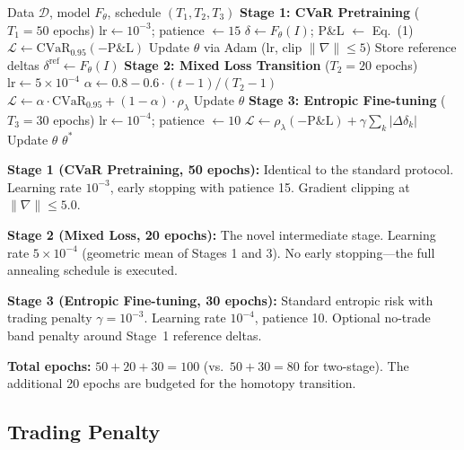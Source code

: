 \documentclass[11pt]{article}
\newcommand{\cvar}{\mathrm{CVaR}}
\begin{document}
\begin{algorithm}[t]
\caption{Three-Stage Curriculum Hedger (3SCH)}
\label{alg:3sch}
\begin{algorithmic}[1]
\REQUIRE Data $\mathcal{D}$, model $F_\theta$, schedule $(T_1, T_2, T_3)$
\STATE \textbf{Stage 1: CVaR Pretraining} ($T_1 = 50$ epochs)
\STATE $\text{lr} \gets 10^{-3}$; patience $\gets 15$
        \STATE $\delta \gets F_\theta(I)$; P\&L $\gets$ Eq.~(1)
        \STATE $\mathcal{L} \gets \cvar_{0.95}(-\text{P\&L})$
        \STATE Update $\theta$ via Adam (lr, clip $\|\nabla\| \leq 5$)
    \ENDFOR
\ENDFOR
\STATE Store reference deltas $\delta^{\text{ref}} \gets F_\theta(I)$
\STATE
\STATE \textbf{Stage 2: Mixed Loss Transition} ($T_2 = 20$ epochs)
\STATE $\text{lr} \gets 5 \times 10^{-4}$
    \STATE $\alpha \gets 0.8 - 0.6 \cdot (t-1) / (T_2 - 1)$
        \STATE $\mathcal{L} \gets \alpha \cdot \cvar_{0.95} + (1-\alpha) \cdot \rho_\lambda$
        \STATE Update $\theta$
    \ENDFOR
\ENDFOR
\STATE
\STATE \textbf{Stage 3: Entropic Fine-tuning} ($T_3 = 30$ epochs)
\STATE $\text{lr} \gets 10^{-4}$; patience $\gets 10$
        \STATE $\mathcal{L} \gets \rho_\lambda(-\text{P\&L}) + \gamma\sum_k|\Delta\delta_k|$
        \STATE Update $\theta$
    \ENDFOR
\ENDFOR
\RETURN $\theta^*$
\end{algorithmic}
\end{algorithm}

\textbf{Stage 1 (CVaR Pretraining, 50 epochs):} Identical to the standard protocol. Learning rate $10^{-3}$, early stopping with patience 15. Gradient clipping at $\|\nabla\| \leq 5.0$.

\textbf{Stage 2 (Mixed Loss, 20 epochs):} The novel intermediate stage. Learning rate $5 \times 10^{-4}$ (geometric mean of Stages 1 and 3). No early stopping---the full annealing schedule is executed.

\textbf{Stage 3 (Entropic Fine-tuning, 30 epochs):} Standard entropic risk with trading penalty $\gamma = 10^{-3}$. Learning rate $10^{-4}$, patience 10. Optional no-trade band penalty around Stage~1 reference deltas.

\textbf{Total epochs:} $50 + 20 + 30 = 100$ (vs.\ $50 + 30 = 80$ for two-stage). The additional 20 epochs are budgeted for the homotopy transition.

\subsection{Trading Penalty}
\end{document}
